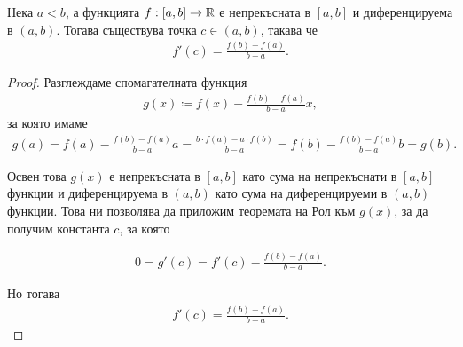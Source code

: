 \documentclass[numbers=endperiod, bibliography=totocnumbered]{scrartcl}
\begin{document}
\begin{theorem}
  Нека \( a < b \), а функцията \( f: [a, b] \to \mathbb{R} \) е непрекъсната в \( [a, b] \) и диференцируема в \( (a, b) \). Тогава съществува точка \( c \in (a, b) \), такава че
  \begin{align*}
    f'(c) = \frac {f(b) - f(a)} {b-a}.
  \end{align*}
\end{theorem}
\begin{proof}
  Разглеждаме спомагателната функция
  \begin{align*}
    g(x) \coloneqq f(x) - \frac {f(b) - f(a)} {b-a} x,
  \end{align*}
  за която имаме
  \begin{align*}
    g(a)
    =
    f(a) - \frac {f(b) - f(a)} {b-a} a
    =
    \frac {b \cdot f(a) - a \cdot f(b)} {b-a}
    =
    f(b) - \frac {f(b) - f(a)} {b-a} b
    =
    g(b).
  \end{align*}

  Освен това \( g(x) \) е непрекъсната в \( [a, b] \) като сума на непрекъснати в \( [a, b] \) функции и диференцируема в \( (a, b) \) като сума на диференцируеми в \( (a, b) \) функции. Това ни позволява да приложим теоремата на Рол към \( g(x) \), за да получим константа \( c \), за която

  \begin{align*}
    0 = g'(c) = f'(c) - \frac {f(b) - f(a)} {b-a}.
  \end{align*}

  Но тогава
  \begin{align*}
    f'(c) = \frac {f(b) - f(a)} {b-a}.
  \end{align*}
\end{proof}
\end{document}
